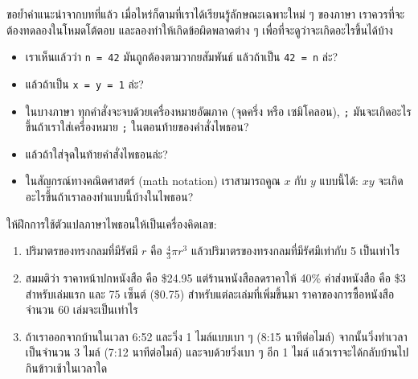 \begin{exercise}

ขอย้ำคำแนะนำจากบทที่แล้ว เมื่อไหร่ก็ตามที่เราได้เรียนรู้ลักษณะเฉพาะใหม่ ๆ ของภาษา 
เราควรที่จะต้องทดลองในโหมดโต้ตอบ และลองทำให้เกิดข้อผิดพลาดต่าง ๆ 
เพื่อที่จะดูว่าจะเกิดอะไรขึ้นได้บ้าง

\begin{itemize}

\item เราเห็นแล้วว่า {\tt n = 42} มันถูกต้องตามวากยสัมพันธ์  แล้วถ้าเป็น {\tt 42 = n} ล่ะ?

\item แล้วถ้าเป็น {\tt x = y = 1} ล่ะ?

\item ในบางภาษา ทุกคำสั่งจะจบด้วยเครื่องหมายอัฒภาค (จุดครึ่ง หรือ เซมิโคลอน), {\tt ;} 
มันจะเกิดอะไรขึ้นถ้าเราใส่เครื่องหมาย {\tt ;} ในตอนท้ายของคำสั่งไพธอน?

\item แล้วถ้าใส่จุดในท้ายคำสั่งไพธอนล่ะ?

\item ในสัญกรณ์ทางคณิตศาสตร์ (math notation) เราสามารถคูณ {\scriptsize$x$} กับ {\scriptsize$y$} แบบนี้ได้: {\scriptsize$x y$}
จะเกิดอะไรขึ้นถ้าเราลองทำแบบนี้บ้างในไพธอน?

\end{itemize}

\end{exercise}


\begin{exercise}

ให้ฝึกการใช้ตัวแปลภาษาไพธอนให้เป็นเครื่องคิดเลข: 

\begin{enumerate}

\item ปริมาตรของทรงกลมที่มีรัศมี {\scriptsize$r$} คือ {\scriptsize$\frac{4}{3} \pi r^3$}
แล้วปริมาตรของทรงกลมที่มีรัศมีเท่ากับ 5 เป็นเท่าไร

\item สมมติว่า ราคาหน้าปกหนังสือ คือ \$24.95 แต่ร้านหนังสือลดราคาให้ 40\% ค่าส่งหนังสือ คือ 
\$3 สำหรับเล่มแรก และ 75 เซ็นต์ (\$0.75) สำหรับแต่ละเล่มที่เพิ่มขึ้นมา ราคาของการซื้อหนังสือ
จำนวน 60 เล่มจะเป็นเท่าไร

\item ถ้าเราออกจากบ้านในเวลา 6:52 และวิ่ง 1 ไมล์แบบเบา ๆ  (8:15 นาทีต่อไมล์) 
จากนั้นวิ่งทำเวลาเป็นจำนวน 3 ไมล์ (7:12 นาทีต่อไมล์) และจบด้วยวิ่งเบา ๆ อีก 1 ไมล์ 
แล้วเราจะได้กลับบ้านไปกินข้าวเช้าในเวลาใด

\end{enumerate}
\end{exercise}



